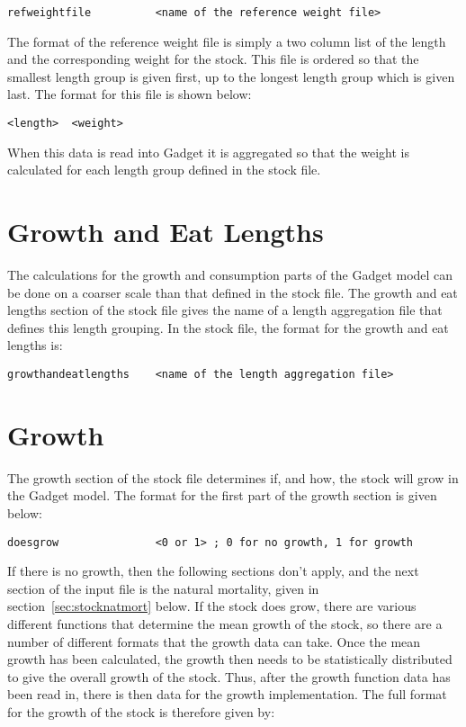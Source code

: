 \documentclass[10pt,twoside]{book}
\begin{document}
{\small\begin{verbatim}
refweightfile          <name of the reference weight file>
\end{verbatim}}

The format of the reference weight file is simply a two column list of the length and the corresponding weight for the stock.  This file is ordered so that the smallest length group is given first, up to the longest length group which is given last.  The format for this file is shown below:

{\small\begin{verbatim}
<length>  <weight>
\end{verbatim}}

When this data is read into Gadget it is aggregated so that the weight is calculated for each length group defined in the stock file.

\section{Growth and Eat Lengths}\label{sec:stockgrowthlength}
The calculations for the growth and consumption parts of the Gadget model can be done on a coarser scale than that defined in the stock file.  The growth and eat lengths section of the stock file gives the name of a length aggregation file that defines this length grouping.  In the stock file, the format for the growth and eat lengths is:

{\small\begin{verbatim}
growthandeatlengths    <name of the length aggregation file>
\end{verbatim}}

\section{Growth}\label{sec:stockgrowth}
The growth section of the stock file determines if, and how, the stock will grow in the Gadget model.  The format for the first part of the growth section is given below:

{\small\begin{verbatim}
doesgrow               <0 or 1> ; 0 for no growth, 1 for growth
\end{verbatim}}

If there is no growth, then the following sections don't apply, and the next section of the input file is the natural mortality, given in section~\ref{sec:stocknatmort} below.  If the stock does grow, there are various different functions that determine the mean growth of the stock, so there are a number of different formats that the growth data can take.  Once the mean growth has been calculated, the growth then needs to be statistically distributed to give the overall growth of the stock.  Thus, after the growth function data has been read in, there is then data for the growth implementation.  The full format for the growth of the stock is therefore given by:
\end{document}
